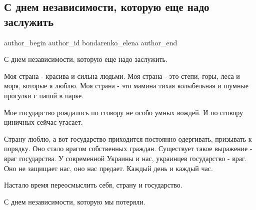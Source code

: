  
 
 
 
 
 
\subsection{С днем независимости, которую еще надо заслужить}
\label{sec:24_08_2021.fb.bondarenko_elena.1.s_dnem_nezavisimosti}
 
\ifcmt
 author_begin
   author_id bondarenko_elena
 author_end
\fi

С днем независимости, которую еще надо заслужить.

Моя страна - красива и сильна людьми. Моя страна - это степи, горы, леса и
моря, которые я люблю. Моя страна - это мамина тихая колыбельная и шумные
прогулки с папой в парке.

Мое государство рождалось по сговору не особо умных вождей. И по сговору
циничных сейчас угасает. 

Страну люблю, а вот государство приходится постоянно одергивать, призывать к
порядку. Оно  стало врагом собственных граждан. Существует такое выражение -
враг государства. У современной Украины и нас, украинцев государство - враг.
Оно не защищает нас, оно нас предает. Каждый день и каждый час.

Настало время переосмыслить себя, страну и государство.

С днем независимости, которую мы потеряли.


